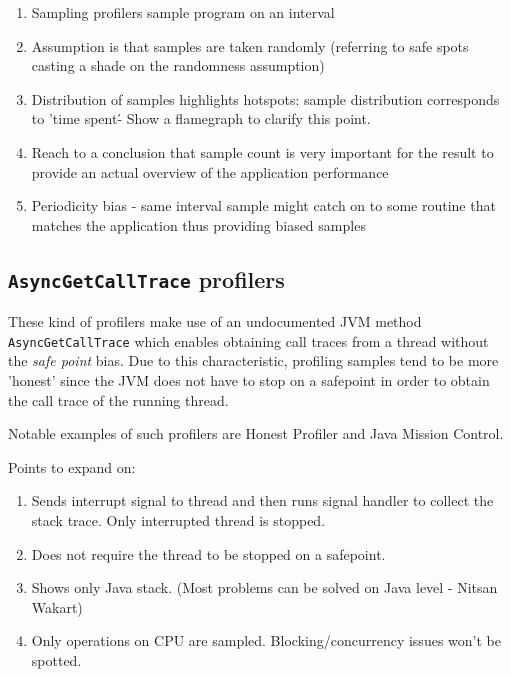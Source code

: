 \documentclass[..thesis.tex]{subfiles}
\begin{document}
\begin{enumerate}
	\item Sampling profilers sample program on an interval
	\item Assumption is that samples are taken randomly (referring to safe spots casting a shade on the randomness assumption)
	\item Distribution of samples highlights hotspots: sample distribution corresponds to 'time spent\' - Show a flamegraph to clarify this point.
	\item Reach to a conclusion that sample count is very important for the result to provide an actual overview of the application performance
	\item Periodicity bias - same interval sample might catch on to some routine that matches the application thus providing biased samples
\end{enumerate}


\subsection{\texttt{AsyncGetCallTrace} profilers}
These kind of profilers make use of an undocumented JVM method \texttt{AsyncGetCallTrace} \cite{agct_source} which enables obtaining call traces from a thread without the \textit{safe point} bias. Due to this characteristic, profiling samples tend to be more 'honest' since the JVM does not have to stop on a safepoint in order to obtain the call trace of the running thread.

Notable examples of such profilers are Honest Profiler and Java Mission Control. 

Points to expand on:
\begin{enumerate}
	\item Sends interrupt signal to thread and then runs signal handler to collect the stack trace. Only interrupted thread is stopped.
	\item Does not require the thread to be stopped on a safepoint.
	\item Shows only Java stack. (Most problems can be solved on Java level - Nitsan Wakart)
	\item Only operations on CPU are sampled. Blocking/concurrency issues won't be spotted.
\end{enumerate}

\end{document}
